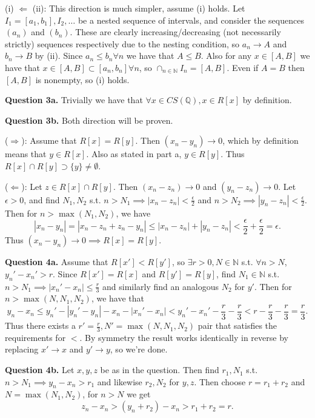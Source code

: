 \documentclass[letterpaper, reqno,11pt]{article}
\begin{document}
(i) $\Leftarrow$ (ii): This direction is much simpler, assume (i) holds. Let $I_1=[a_1,b_1],I_2,\ldots$ be a nested sequence of intervals, and consider the sequences $(a_n)$ and $(b_n)$. These are clearly increasing/decreasing (not necessarily strictly) sequences respectively due to the nesting condition, so $a_n\to A$ and $b_n\to B$ by (ii). Since $a_n\leq b_n\forall n$ we have that $A\leq B$. Also for any $x\in [A,B]$ we have that $x\in[A,B]\subset [a_n,b_n]\forall n$, so $\cap_{n\in \mathbb{N}}I_n=[A,B]$. Even if $A=B$ then $[A,B]$ is nonempty, so (i) holds.

\newpage\phantom{blabla}
\newpage

{\medskip\noindent\bf Question 3a.} Trivially we have that $\forall x\in CS(\mathbb{Q}),x\in R[x]$ by definition.

{\medskip\noindent\bf Question 3b.} Both direction will be proven.

($\Rightarrow$): Assume that $R[x]=R[y]$. Then $(x_n-y_n)\to 0$, which by definition means that $y\in R[x]$. Also as stated in part a, $y\in R[y]$. Thus $R[x]\cap R[y]\supset \{y\}\neq \emptyset$.

($\Leftarrow$): Let $z\in R[x]\cap R[y]$. Then $(x_n-z_n)\to 0$ and $(y_n-z_n)\to 0$. Let $\epsilon>0$, and find $N_1,N_2$ s.t. $n>N_1\implies |x_n-z_n|<\frac{\epsilon}{2}$ and $n>N_2\implies|y_n-z_n|<\frac{\epsilon}{2}$. Then for $n>\max(N_1,N_2)$, we have
\[
\left| x_n-y_n \right| =\left| x_n-z_n+z_n-y_n \right| \leq \left| x_n-z_n \right| +\left| y_n-z_n \right| <\frac{\epsilon}{2}+\frac{\epsilon}{2}=\epsilon
.\]
Thus $(x_n-y_n)\to 0\implies R[x]=R[y]$.

\newpage\phantom{blabla}
\newpage

{\medskip\noindent\bf Question 4a.} Assume that $R[x']<R[y']$, so $\exists r>0,N\in \mathbb{N}$ s.t. $\forall n>N$, $y_n'-x_n'>r$. Since $R[x']=R[x]$ and $R[y']=R[y]$, find $N_1\in \mathbb{N}$ s.t. $n>N_1\implies \left| x_n'-x_n \right|\leq \frac{r}{3}$ and similarly find an analogous $N_2$ for $y'$. Then for $n>\max(N,N_1,N_2)$, we have that
\[
y_n-x_n\leq y_n' -\left| y_n'-y_n \right| -x_n - \left| x_n'-x_n \right| < y_n'-x_n' -\frac{r}{3}-\frac{r}{3}<r-\frac{r}{3}-\frac{r}{3}=\frac{r}{3}
.\]
Thus there exists a $r'=\frac{r}{3},N'=\max(N,N_1,N_2)$ pair that satisfies the requirements for $<$. By symmetry the result works identically in reverse by replacing $x'\to x$ and $y'\to y$, so we're done.

{\medskip\noindent\bf Question 4b.} Let $x,y,z$ be as in the question. Then find $r_1,N_1$ s.t. $n>N_1\implies y_n-x_n>r_1 $ and likewise $r_2,N_2$ for $y,z$. Then choose $r=r_1+r_2$ and $N=\max(N_1,N_2)$, for $n>N$ we get
\[
z_n-x_n>(y_n+r_2)-x_n>r_1+r_2=r
.\]
\end{document}
